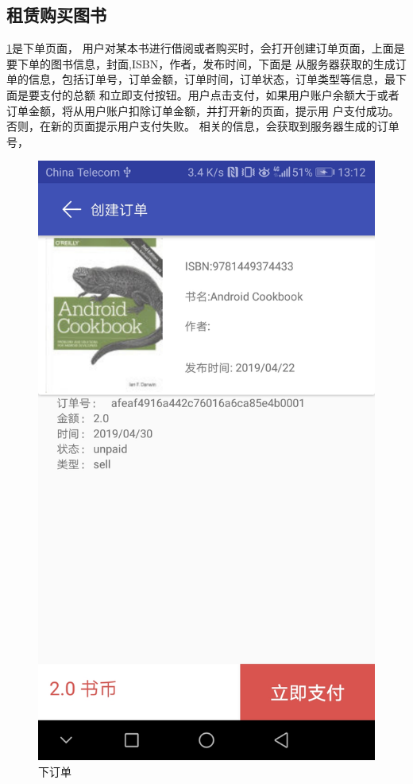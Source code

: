\subsection{租赁购买图书}
\cref{order}是下单页面， 用户对某本书进行借阅或者购买时，会打开创建订单页面，上面是要下单的图书信息，封面,ISBN，作者，发布时间，下面是
从服务器获取的生成订单的信息，包括订单号，订单金额，订单时间，订单状态，订单类型等信息，最下面是要支付的总额
和立即支付按钮。用户点击支付，如果用户账户余额大于或者订单金额，将从用户账户扣除订单金额，并打开新的页面，提示用
户支付成功。否则，在新的页面提示用户支付失败。
相关的信息，会获取到服务器生成的订单号，

\begin{figure}[h]
	\centering
	\includegraphics[scale=0.09]{Chapters/UI/order.jpg}
	\caption{下订单}
	\label{order}
\end{figure}

